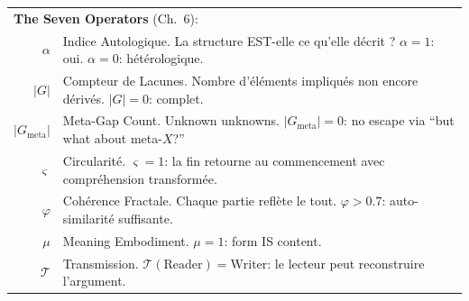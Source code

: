 \documentclass[10pt, openany, oneside]{book}
\renewcommand{\footnotesize}{\fontsize{8.5}{11}\selectfont}
\begin{document}
{\footnotesize
\noindent\begin{tabular}{@{} r @{\hspace{0.6em}} p{} @{}}
\multicolumn{2}{l}{\textbf{The Seven Operators} (Ch.\ 6):} \\[0.3em]
$\alpha$ & Indice Autologique. La structure EST-elle ce qu'elle décrit ? $\alpha = 1$: oui. $\alpha = 0$: hétérologique. \\[0.3em]
$|G|$ & Compteur de Lacunes. Nombre d'éléments impliqués non encore dérivés. $|G| = 0$: complet. \\[0.3em]
$|G_{\text{meta}}|$ & Meta-Gap Count. Unknown unknowns. $|G_{\text{meta}}| = 0$: no escape via ``but what about meta-$X$?'' \\[0.3em]
$\varsigma$ & Circularité. $\varsigma = 1$: la fin retourne au commencement avec compréhension transformée. \\[0.3em]
$\varphi$ & Cohérence Fractale. Chaque partie reflète le tout. $\varphi > 0.7$: auto-similarité suffisante. \\[0.3em]
$\mu$ & Meaning Embodiment. $\mu = 1$: form IS content. \\[0.3em]
$\mathcal{T}$ & Transmission. $\mathcal{T}(\text{Reader}) = \text{Writer}$: le lecteur peut reconstruire l'argument. \\[0.3em]
\end{tabular}
}

\vspace{0.5em}
\end{document}
